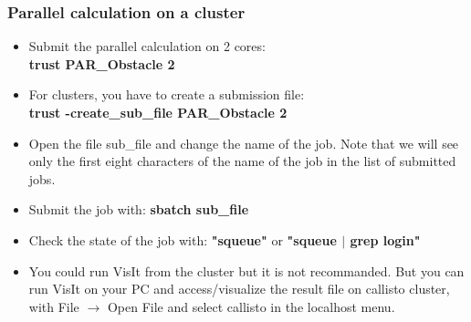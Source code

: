 \documentclass[10pt]{beamer}
\begin{document}
\begin{frame}
\frametitle{Parallel calculation on a cluster}
\begin{block}{}

\begin{itemize}
\item Submit the parallel calculation on 2 cores:\\
\vspace{0.2cm}
\textbf{trust PAR\_Obstacle 2}
\vspace{0.2cm}

\item For clusters, you have to create a submission file:\\
\vspace{0.2cm}
\textbf{trust -create\_sub\_file PAR\_Obstacle 2}
\vspace{0.2cm}

\item Open the file sub\_file and change the name of the job. Note that we will see only the first eight characters of the name of the job in the list of submitted jobs.
\vspace{0.2cm}

\item Submit the job with: \textbf{sbatch sub\_file}
\vspace{0.2cm}

\item Check the state of the job with: \textbf{"squeue"} or \textbf{"squeue $|$ grep login"}
\vspace{0.2cm}

\item You could run VisIt from the cluster but it is not recommanded. But you can run VisIt on your PC and access/visualize the result file on callisto cluster, with File $\rightarrow$ Open File and select callisto in the localhost menu.
\end{itemize}

\end{block}
\end{frame}
\end{document}
